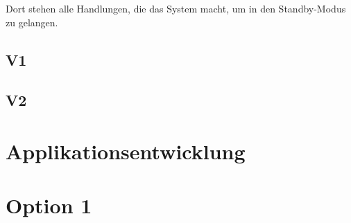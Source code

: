 Dort stehen alle Handlungen, die das System macht, um in den Standby-Modus zu gelangen.

\subsection{V1}


\subsection{V2}


\section{Applikationsentwicklung}

\section{Option 1}






